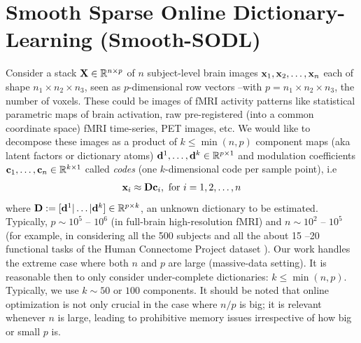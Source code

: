 \section{Smooth Sparse Online Dictionary-Learning (Smooth-SODL)}
\label{sec:contrib}
Consider a stack $\mathbf{X}
\in \mathbb R^{n \times p}$ of $n$ subject-level brain images
$\mathbf{x}_1,\mathbf{x}_2,\ldots,\mathbf{x}_n$ each of shape $n_1 \times n_2 \times n_3$, seen as
$p$-dimensional row vectors --with $p = n_1\times n_2 \times n_3$, the number of voxels. These could be images of fMRI activity
patterns like statistical parametric maps of brain activation, raw
pre-registered (into a common coordinate space) fMRI time-series, PET
images, etc. We would like to decompose these images as a product of
$k \le \min(n, p)$ component maps (aka latent factors or dictionary atoms)
 $\mathbf{d}^1,
\ldots, \mathbf{d}^k \in \mathbb{R}^{p \times 1}$ and modulation coefficients
$\mathbf{c}_1, \ldots, \mathbf{c}_n \in \mathbb R^{k \times 1}$ called \textit{codes} (one $k$-dimensional code per sample point), i.e
\begin{eqnarray}
\mathbf{x}_i \approx \mathbf{D} \mathbf{c}_i, \text{ for } i=1,2,\ldots,n
\end{eqnarray}
where $\mathbf{D} := [\mathbf{d}^1|\ldots|\mathbf{d}^k] \in \mathbb{R}^{p \times k}$, an unknown dictionary to be estimated.
Typically, $p \sim 10^{5}$ --
$10^{6}$ (in full-brain high-resolution fMRI) and $n \sim 10^{2}$ --
$10^{5}$ (for example, in considering all the 500 subjects and all
the about 15 --20 functional tasks of the Human Connectome Project dataset   \citep{VanEssen20122222}). Our work handles the extreme
case where both $n$ and $p$ are large (massive-data setting). 
%
It is reasonable then to only consider under-complete dictionaries: $k
\le \min(n, p)$. Typically, we use $k \sim 50$ or $100$ components.
%
It should be noted that online optimization is not only crucial in the
case where $n / p$ is big; it is relevant whenever $n$ is large,
leading to prohibitive memory issues irrespective of how big or small
$p$ is.

